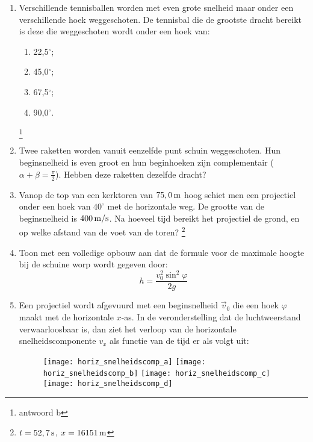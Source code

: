 \begin{enumerate}
\item Verschillende tennisballen worden met even grote snelheid maar
onder een verschillende hoek weggeschoten. De tennisbal die de
grootste dracht bereikt is deze die weggeschoten wordt onder een
hoek van:
\begin{enumerate}
\item 22,5$^\circ$;
\item 45,0$^\circ$;
\item 67,5$^\circ$;
\item 90,0$^\circ$.
\end{enumerate}
\footnote{antwoord b}

\item Twee raketten worden vanuit eenzelfde punt schuin
weggeschoten. Hun beginsnelheid is even groot en hun beginhoeken
zijn complementair ($\alpha+\beta=\frac{\pi}{2}$). Hebben deze
raketten dezelfde dracht?

\item Vanop de top van een kerktoren van $75,0\rm\,m$ hoog schiet
men een projectiel onder een hoek van $40^\circ$ met de horizontale
weg. De grootte van de beginsnelheid is $400\rm\,m/s$. Na hoeveel
tijd bereikt het projectiel de grond, en op welke afstand van de
voet van de toren? \footnote{$t=52,7\rm\,s$, $x=16151\rm\,m$}

\item Toon met een volledige opbouw aan dat de formule voor de
maximale hoogte bij de schuine worp wordt gegeven door:
\begin{displaymath}
h=\frac{v_0^2\sin^2{\varphi}}{2g}
\end{displaymath}

\item Een projectiel wordt afgevuurd met een beginsnelheid
$\vec{v}_0$ die een hoek $\varphi$ maakt met de horizontale
\mbox{$x$-as}.
\newline
In de veronderstelling dat de luchtweerstand verwaarloosbaar is, dan
ziet het verloop van de horizontale snelheidscomponente $v_x$ als
functie van de tijd er als volgt uit:
\begin{figure}[h]
\begin{flushright}
\texttt{[image: horiz\_snelheidscomp\_a]}
\texttt{[image: horiz\_snelheidscomp\_b]}
\texttt{[image: horiz\_snelheidscomp\_c]}
\texttt{[image: horiz\_snelheidscomp\_d]}
\end{flushright}
\end{figure}


\end{enumerate}
